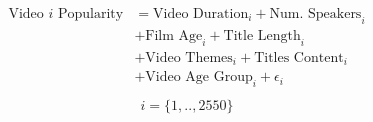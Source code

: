 \begin{align}
\begin{split}
\text{Video $i$ Popularity}&=\text{Video Duration}_i+\text{Num. Speakers}_i\\
&+\text{Film Age}_i+\text{Title Length}_i\\
&+\text{Video Themes}_i+\text{Titles Content}_i\\
& +\text{Video Age Group}_i+\epsilon_i\\
\end{split}
\label{simple_linear_eqn}
\end{align}
\begin{equation*}
i=\{1,..,2550\}
\end{equation*}